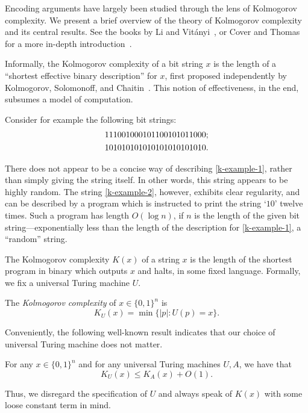 Encoding arguments have largely been studied through the lens of
Kolmogorov complexity. We present a brief overview of the theory of
Kolmogorov complexity and its central results. See the books by Li and
Vit\'{a}nyi~\cite{li.vitanyi:introduction}, or Cover and Thomas for a
more in-depth introduction~\cite{thomas:elements}.

Informally, the Kolmogorov complexity of a bit string $x$ is the
length of a ``shortest effective binary description'' for $x$, first
proposed independently by Kolmogorov, Solomonoff, and
Chaitin~\cite{chaitin:intro, kolmogorov:complexity,
  solomonoff:intro}. This notion of effectiveness, in the end,
subsumes a model of computation.

Consider for example the following bit strings:
\begin{align}
  &111001000101100101011000; \eqlabel{k-example-1}\\
  &101010101010101010101010. \eqlabel{k-example-2}
\end{align}

There does not appear to be a concise way of describing
\eqref{k-example-1}, rather than simply giving the string itself. In
other words, this string appears to be highly random. The string
\eqref{k-example-2}, however, exhibits clear regularity, and can be
described by a program which is instructed to print the string `$10$'
twelve times. Such a program has length $O(\log n)$, if $n$ is the
length of the given bit string---exponentially less than the length of
the description for \eqref{k-example-1}, a ``random'' string.

The Kolmogorov complexity $K(x)$ of a string $x$ is the length of the
shortest program in binary which outputs $x$ and halts, in some fixed
language. Formally, we fix a universal Turing machine $U$.

\begin{defn}
  The \emph{Kolmogorov complexity} of $x \in \{0, 1\}^n$ is
  \[K_U(x) = \min \{ |p| : U(p) = x\}.\]
\end{defn}

Conveniently, the following well-known result indicates that our
choice of universal Turing machine does not matter.
\begin{thm}
  For any $x \in \{0, 1\}^n$ and for any universal Turing machines
  $U, A$, we have that
  \[K_U(x) \leq K_A(x) + O(1).\]
\end{thm}

Thus, we disregard the specification of $U$ and always speak of $K(x)$
with some loose constant term in mind.

